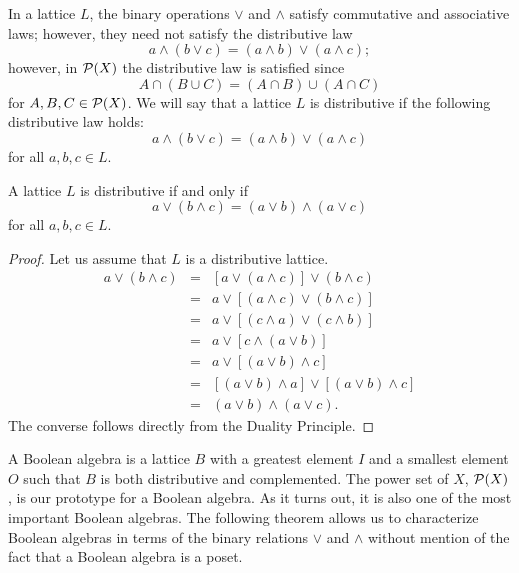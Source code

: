  
In a lattice $L$, the binary operations $\vee$ and $\wedge$ satisfy
commutative and associative laws; however, they need not satisfy the
distributive law 
$$ 
a \wedge ( b \vee c ) = (a \wedge b ) \vee ( a \wedge c );
$$ 
however, in ${\cal P}(X)$ the distributive law is satisfied since
$$
A \cap ( B \cup C ) = (A \cap B ) \cup ( A \cap C )
$$
for $A, B, C \in {\cal P}(X)$. We will say that a lattice $L$ is
{\bfi distributive\/} if the following
distributive law holds:
$$
a \wedge ( b \vee c ) = (a \wedge b ) \vee ( a \wedge c )
$$
for all $a, b, c \in L$.
 
 
\begin{theorem}
A lattice $L$ is distributive if and only if 
$$
a \vee ( b \wedge c ) = ( a \vee b ) \wedge ( a \vee c )
$$
for all $a, b, c \in L$.
\end{theorem}
 
 
\begin{proof}
Let us assume that $L$ is a distributive lattice.
\begin{eqnarray*}
a \vee ( b \wedge c ) 
& = & [a \vee (a \wedge c) ] \vee ( b \wedge c ) \\
& = & a \vee [(a \wedge c)  \vee ( b \wedge c )] \\
& = & a \vee [(c \wedge a)  \vee ( c \wedge b )] \\
& = & a \vee [c \wedge ( a  \vee b )] \\
& = & a \vee [( a  \vee b ) \wedge c ] \\
& = & [( a  \vee b ) \wedge a ] \vee [(a \vee b) \wedge c ] \\
& = & ( a \vee b ) \wedge ( a \vee c ).
\end{eqnarray*}
The converse follows directly from the Duality Principle.
\end{proof}
 
 
\medskip
 
 
A {\bfi Boolean algebra\/} is a
lattice $B$ with a greatest element $I$ and a smallest element $O$
such that $B$ is both distributive and complemented. The power set of
$X$, ${\cal P}(X)$, is our prototype for a Boolean algebra.  As it
turns out, it is also one of the most important Boolean algebras. The
following theorem allows us to characterize Boolean algebras in terms
of the binary relations $\vee$ and $\wedge$ without mention of the
fact that a Boolean algebra is a poset. 
 
